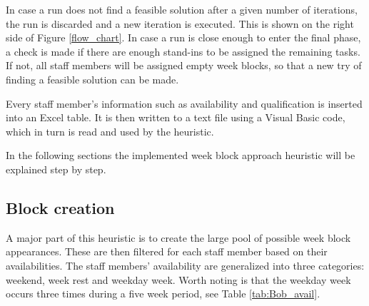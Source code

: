 \begin{figure}[!h]
{
		}
\end{figure}

In case a run does not find a feasible solution after a given number of iterations, the run is discarded and a new iteration is executed. This is shown on the right side of Figure \ref{flow_chart}. In case a run is close enough to enter the final phase, a check is made if there are enough stand-ins to be assigned the remaining tasks. If not, all staff members will be assigned empty week blocks, so that a new try of finding a feasible solution can be made.

Every staff member's information such as availability and qualification is inserted into an Excel table. It is then written to a text file using a Visual Basic code, which in turn is read and used by the heuristic.

In the following sections the implemented week block approach heuristic will be explained step by step.

\subsection{Block creation} \label{block_creation}
A major part of this heuristic is to create the large pool of possible week block appearances. These are then filtered for each staff member based on their availabilities. The staff members' availability are generalized into three categories: weekend, week rest and weekday week. Worth noting is that the weekday week occurs three times during a five week period, see Table \ref{tab:Bob_avail}. 


